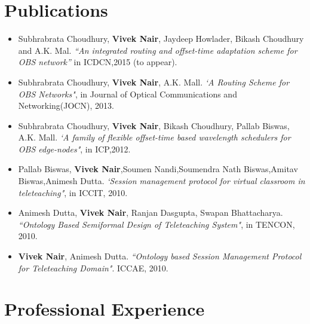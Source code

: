 \documentclass[margin,line]{res}
\begin{document}
\begin{resume}
\section{\sc Publications}
\begin{itemize}
\item Subhrabrata Choudhury, \textbf{Vivek Nair}, Jaydeep Howlader, Bikash Choudhury and A.K. Mal. \textit{``An integrated routing and offset-time adaptation scheme for OBS network''} in ICDCN,2015 (to appear).
\item Subhrabrata Choudhury, \textbf{Vivek Nair}, A.K. Mall. \textit{`A Routing Scheme for OBS Networks"}, in Journal of Optical Communications and Networking(JOCN), 2013.
\item Subhrabrata Choudhury, \textbf{Vivek Nair}, Bikash Choudhury, Pallab Biswas, A.K. Mall. \textit{`A family of flexible offset-time based wavelength schedulers for OBS edge-nodes"}, in ICP,2012.
\item Pallab Biswas, \textbf{Vivek Nair},Soumen Nandi,Soumendra Nath Biswas,Amitav Biswas,Animesh Dutta. \textit{`Session management protocol for virtual classroom in teleteaching"}, in ICCIT, 2010.
\item Animesh Dutta, \textbf{Vivek Nair}, Ranjan Dasgupta, Swapan Bhattacharya. \textit{``Ontology Based Semiformal Design of Teleteaching System"}, in TENCON, 2010.
\item \textbf{Vivek Nair}, Animesh Dutta. \textit{``Ontology based Session Management Protocol for Teleteaching Domain"}. ICCAE, 2010.
\end{itemize}

\section{\sc Professional Experience}


\end{resume}
\end{document}
